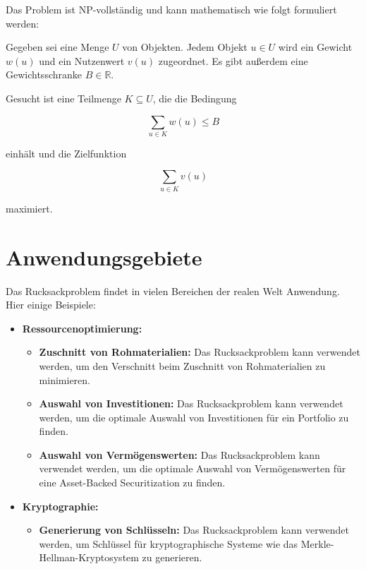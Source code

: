 \documentclass[12pt]{report}
\begin{document}
Das Problem ist NP-vollständig und kann mathematisch wie folgt formuliert werden:

Gegeben sei eine Menge $U$ von Objekten. Jedem Objekt $u \in U$ wird ein Gewicht $w(u)$ und ein Nutzenwert $v(u)$ zugeordnet. Es gibt außerdem eine Gewichtsschranke $B \in \mathbb{R}$.

Gesucht ist eine Teilmenge $K \subseteq U$, die die Bedingung

$$\sum_{u \in K} w(u) \leq B$$

einhält und die Zielfunktion

$$\sum_{u \in K} v(u)$$

maximiert. \cite{kellerer2004knapsack}



\section{Anwendungsgebiete}
Das Rucksackproblem findet in vielen Bereichen der realen Welt Anwendung. Hier einige Beispiele:

\begin{itemize}
	\item \textbf{Ressourcenoptimierung:}
	\begin{itemize}
		\item \textbf{Zuschnitt von Rohmaterialien:} Das Rucksackproblem kann verwendet werden, um den Verschnitt beim Zuschnitt von Rohmaterialien zu minimieren.\cite{kellerer2004knapsack} 
		\item \textbf{Auswahl von Investitionen:} Das Rucksackproblem kann verwendet werden, um die optimale Auswahl von Investitionen für ein Portfolio zu finden.\cite{kellerer2004knapsack}
		\item \textbf{Auswahl von Vermögenswerten:} Das Rucksackproblem kann verwendet werden, um die optimale Auswahl von Vermögenswerten für eine Asset-Backed Securitization zu finden.\cite{kellerer2004knapsack}
	\end{itemize}
	\item \textbf{Kryptographie:}
	\begin{itemize}
		\item \textbf{Generierung von Schlüsseln:} Das Rucksackproblem kann verwendet werden, um Schlüssel für kryptographische Systeme wie das Merkle-Hellman-Kryptosystem zu generieren.\cite{kellerer2004knapsack}
	\end{itemize}
\end{itemize}
\end{document}
